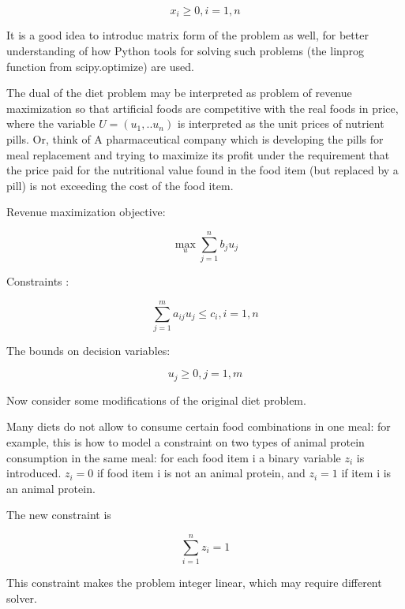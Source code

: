    \begin{equation}
    x_i\ge 0, i=1,n
    \end{equation}

It is a good idea to introduc matrix form of the problem as well, for better understanding of how  Python tools for solving such problems (the linprog function from scipy.optimize) are used.

The dual of the diet problem may be interpreted as problem of revenue maximization so that artificial foods are competitive with the real foods in price, where the variable $U=(u_1,..u_n )$ is interpreted as the unit prices of nutrient pills. 
Or, think of A pharmaceutical company which is developing the pills for meal replacement and  trying to maximize its profit under the requirement that the price paid for the nutritional value found in the food item (but replaced by a pill) is not exceeding the cost of the food item.

Revenue maximization objective:

    \begin{equation} 
   \max_u \sum_{j=1}^{n}{b_ju_j}
    \end{equation}

Constraints :

   \begin{equation} 
    \sum_{j=1}^{m}{a_{ij}u_j}\le c_i, i=1,n
    \end{equation}

The bounds on decision variables:

   \begin{equation} 
    u_j\ge 0, j=1,m
    \end{equation}


Now consider some modifications of the original diet problem. 

Many diets do not allow to consume certain food combinations in one meal: for example, this is how to model a constraint on two types of animal protein consumption in the same meal: for each food item i a binary variable $ z_i$ is introduced.  $z_i=0$ if food item i is not an animal protein, and $ z_i=1$ if item i is an animal protein.

The new constraint is


   \begin{equation} %
    \sum_{i=1}^{n}z_i=1
    \end{equation}

This constraint makes the problem integer linear, which may require different solver.

